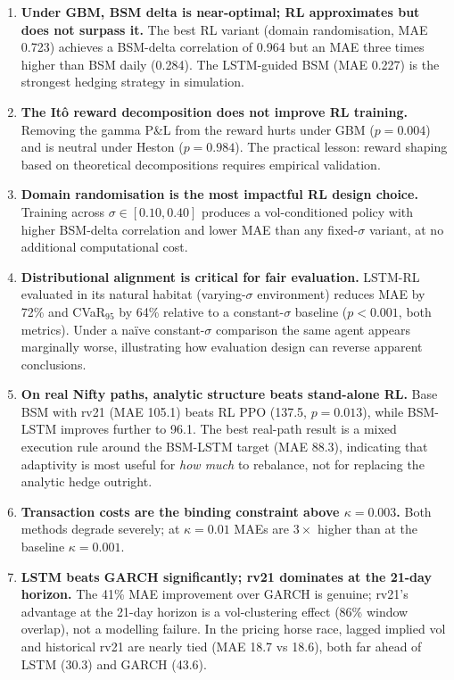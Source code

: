 \documentclass[12pt,a4paper]{article}
\begin{document}
\begin{enumerate}[leftmargin=*]
  \item \textbf{Under GBM, BSM delta is near-optimal; RL approximates but does
        not surpass it.}  The best RL variant (domain randomisation, MAE 0.723)
        achieves a BSM-delta correlation of 0.964 but an MAE three times higher
        than BSM daily (0.284).  The LSTM-guided BSM (MAE 0.227) is the
        strongest hedging strategy in simulation.

  \item \textbf{The It\^{o} reward decomposition does not improve RL training.}
        Removing the gamma P\&L from the reward hurts under GBM ($p=0.004$)
        and is neutral under Heston ($p=0.984$).  The practical lesson: reward
        shaping based on theoretical decompositions requires empirical
        validation.

  \item \textbf{Domain randomisation is the most impactful RL design choice.}
        Training across $\sigma\in[0.10,0.40]$ produces a vol-conditioned
        policy with higher BSM-delta correlation and lower MAE than any fixed-$\sigma$
        variant, at no additional computational cost.

  \item \textbf{Distributional alignment is critical for fair evaluation.}
        LSTM-RL evaluated in its natural habitat (varying-$\sigma$ environment)
        reduces MAE by 72\% and CVaR$_{95}$ by 64\% relative to a
        constant-$\sigma$ baseline ($p<0.001$, both metrics).  Under a
        na\"{i}ve constant-$\sigma$ comparison the same agent appears marginally
        worse, illustrating how evaluation design can reverse apparent conclusions.

  \item \textbf{On real Nifty paths, analytic structure beats stand-alone RL.}
        Base BSM with rv21 (MAE 105.1) beats RL PPO (137.5, $p=0.013$), while
        BSM-LSTM improves further to 96.1.  The best real-path result is a
        mixed execution rule around the BSM-LSTM target (MAE 88.3), indicating
        that adaptivity is most useful for \emph{how much} to rebalance, not
        for replacing the analytic hedge outright.

  \item \textbf{Transaction costs are the binding constraint above
        $\kappa = 0.003$.}  Both methods degrade severely; at $\kappa=0.01$
        MAEs are $3\times$ higher than at the baseline $\kappa=0.001$.

  \item \textbf{LSTM beats GARCH significantly; rv21 dominates at the 21-day
        horizon.}  The 41\% MAE improvement over GARCH is genuine; rv21's
        advantage at the 21-day horizon is a vol-clustering effect (86\%
        window overlap), not a modelling failure.  In the pricing horse race,
        lagged implied vol and historical rv21 are nearly tied (MAE 18.7 vs
        18.6), both far ahead of LSTM (30.3) and GARCH (43.6).
\end{enumerate}
\end{document}
